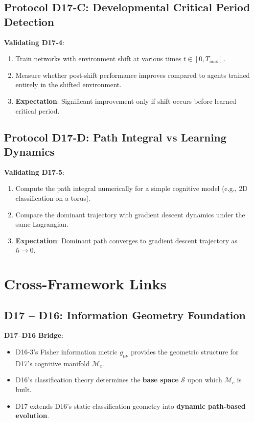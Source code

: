 \documentclass[12pt, a4paper]{article}
\begin{document}
\subsection{Protocol D17-C: Developmental Critical Period Detection}

\textbf{Validating D17-4}:
\begin{enumerate}
    \item Train networks with environment shift at various times $t \in [0, T_{\max}]$.
    \item Measure whether post-shift performance improves compared to agents trained entirely in the shifted environment.
    \item \textbf{Expectation}: Significant improvement only if shift occurs before learned critical period.
\end{enumerate}

\subsection{Protocol D17-D: Path Integral vs Learning Dynamics}

\textbf{Validating D17-5}:
\begin{enumerate}
    \item Compute the path integral numerically for a simple cognitive model (e.g., 2D classification on a torus).
    \item Compare the dominant trajectory with gradient descent dynamics under the same Lagrangian.
    \item \textbf{Expectation}: Dominant path converges to gradient descent trajectory as $\hbar \to 0$.
\end{enumerate}

\section{Cross-Framework Links}

\subsection{D17 -- D16: Information Geometry Foundation}

\textbf{D17--D16 Bridge}:
\begin{itemize}
    \item D16-3's Fisher information metric $g_{\mu\nu}$ provides the geometric structure for D17's cognitive manifold $\mathcal{M}_c$.
    \item D16's classification theory determines the \textbf{base space} $\mathcal{S}$ upon which $\mathcal{M}_c$ is built.
    \item D17 extends D16's static classification geometry into \textbf{dynamic path-based evolution}.
\end{itemize}
\end{document}
